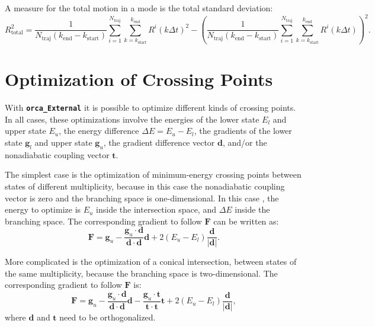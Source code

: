 \documentclass[a4paper,10pt,DIV=15,openany,twoside=false]{scrbook}
\newcommand{\ttt}[1]{\textbf{\texttt{#1}}}
\newcommand{\VEC}[1]{\ensuremath{\mathbf{#1}}}
\begin{document}
A measure for the total motion in a mode is the total standard deviation:
\begin{equation}
  R_\text{total}^2=
  \frac{1}{N_\text{traj}(k_\text{end}-k_\text{start})}
  \sum_{i=1}^{N_\text{traj}}
  \sum_{k=k_\text{start}}^{k_\text{end}} 
  R^i(k\Delta t)^2
  -
  \left(
  \frac{1}{N_\text{traj}(k_\text{end}-k_\text{start})}
  \sum_{i=1}^{N_\text{traj}}
  \sum_{k=k_\text{start}}^{k_\text{end}} 
  R^i(k\Delta t)
  \right)^2.
\end{equation}


\section{Optimization of Crossing Points}\label{met:orcaopt}

With \ttt{orca\_External} it is possible to optimize different kinds of crossing points.
In all cases, these optimizations involve the energies of the lower state $E_l$ and upper state $E_u$, the energy difference $\Delta E=E_u-E_l$, the gradients of the lower state $\VEC{g}_l$ and upper state $\VEC{g}_u$, the gradient difference vector $\VEC{d}$, and/or the nonadiabatic coupling vector $\VEC{t}$.

The simplest case is the optimization of minimum-energy crossing points between states of different multiplicity, because in this case the nonadiabatic coupling vector is zero and the branching space is one-dimensional.
In this case \cite{Bearpark}, the energy to optimize is $E_u$ inside the intersection space, and $\Delta E$ inside the branching space.
The corresponding gradient to follow $\VEC{F}$ can be written as:
\begin{equation}
  \VEC{F}=\VEC{g}_u-\frac{\VEC{g}_u\cdot\VEC{d}}{\VEC{d}\cdot\VEC{d}}\VEC{d}+2(E_u-E_l)\frac{\VEC{d}}{|\VEC{d}|}.
\end{equation}

More complicated is the optimization of a conical intersection, between states of the same multiplicity, because the branching space is two-dimensional.
The corresponding gradient to follow $\VEC{F}$ is:
\begin{equation}
  \VEC{F}=\VEC{g}_u
  -\frac{\VEC{g}_u\cdot\VEC{d}}{\VEC{d}\cdot\VEC{d}}\VEC{d}
  -\frac{\VEC{g}_u\cdot\VEC{t}}{\VEC{t}\cdot\VEC{t}}\VEC{t}
  +2(E_u-E_l)\frac{\VEC{d}}{|\VEC{d}|},
\end{equation}
where $\VEC{d}$ and $\VEC{t}$ need to be orthogonalized.
\end{document}
